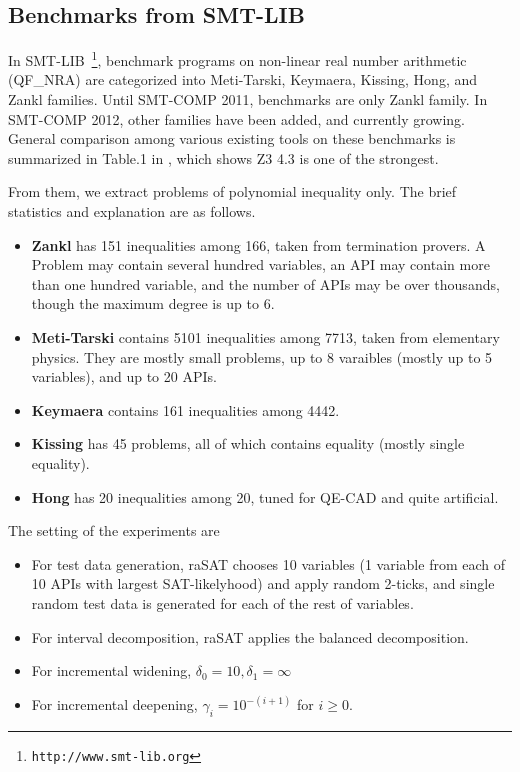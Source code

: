 \documentclass[runningheads,a4paper,oribibl]{llncs}
\begin{document}
\subsection{Benchmarks from SMT-LIB} \label{sec:expsmtlib}

In SMT-LIB~\footnote{\tt http://www.smt-lib.org}, 
benchmark programs on non-linear real number arithmetic 
(QF\_NRA) are categorized into Meti-Tarski, Keymaera, Kissing, Hong, and Zankl families. 
Until SMT-COMP 2011, benchmarks are only Zankl family. 
In SMT-COMP 2012, other families have been added, and currently growing. 
General comparison among various existing tools on these benchmarks is summarized in 
Table.1 in \cite{Jovanovic13}, which shows Z3 4.3 is one of the strongest. 

From them, we extract problems of polynomial inequality only. %
The brief statistics and explanation are as follows. 
\begin{itemize}
\item {\bf Zankl} has 151 inequalities among 166, taken from termination provers. 
A Problem may contain several hundred variables, an API may contain more than one hundred variable, 
and the number of APIs may be over thousands, though the maximum degree is up to $6$. 
\item {\bf Meti-Tarski} contains 5101 inequalities among 7713, taken from elementary physics.
They are mostly small problems, up to 8 varaibles (mostly up to 5 variables), and up to 20 APIs. 
\item {\bf Keymaera} contains 161 inequalities among 4442. 
\item {\bf Kissing} has 45 problems, all of which contains equality (mostly single equality). 
\item {\bf Hong} has 20 inequalities among 20, tuned for QE-CAD and quite artificial. 
\end{itemize}


The setting of the experiments are
\begin{itemize}
\item For test data generation, raSAT chooses 10 variables (1 variable from each of 10 APIs with largest SAT-likelyhood) and apply random 2-ticks, and single random test data is generated for each of the rest of variables.
\item For interval decomposition, raSAT applies the balanced decomposition.
\item For incremental widening, $\delta_0 = 10, \delta_1 = \infty$
\item For incremental deepening, $\gamma_i = 10^{-(i+1)}$ for $i \ge 0$.
\end{itemize}
\end{document}
